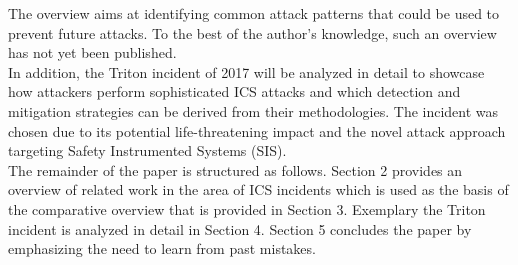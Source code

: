 \documentclass[runningheads]{llncs}
\begin{document}
The overview aims at identifying common attack patterns that could be used to prevent future attacks.
To the best of the author's knowledge, such an overview has not yet been published.\\
In addition, the Triton incident of 2017 will be analyzed in detail to showcase how attackers perform sophisticated ICS attacks and which detection and mitigation strategies can be derived from their methodologies.
The incident was chosen due to its potential life-threatening impact and the novel attack approach targeting Safety Instrumented Systems (SIS).\\
The remainder of the paper is structured as follows.
Section 2 provides an overview of related work in the area of ICS incidents which is used as the basis of the comparative overview that is provided in Section 3.
Exemplary the Triton incident is analyzed in detail in Section 4.
Section 5 concludes the paper by emphasizing the need to learn from past mistakes.
\end{document}
